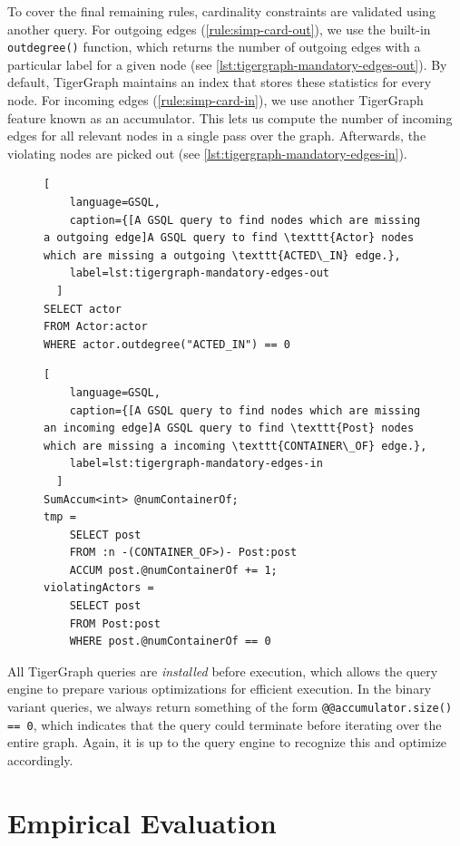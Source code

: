 \documentclass{report}
\theoremstyle{definition}
\begin{document}
To cover the final remaining rules, cardinality constraints are validated using another query. For outgoing edges (\autoref{rule:simp-card-out}), we use the built-in \texttt{outdegree()} function, which returns the number of outgoing edges with a particular label for a given node (see \autoref{lst:tigergraph-mandatory-edges-out}). By default, TigerGraph maintains an index that stores these statistics for every node. For incoming edges (\autoref{rule:simp-card-in}), we use another TigerGraph feature known as an accumulator. This lets us compute the number of incoming edges for all relevant nodes in a single pass over the graph. Afterwards, the violating nodes are picked out (see \autoref{lst:tigergraph-mandatory-edges-in}).

\begin{figure}[H]
  \begin{lstlisting}[
    language=GSQL,
    caption={[A GSQL query to find nodes which are missing a outgoing edge]A GSQL query to find \texttt{Actor} nodes which are missing a outgoing \texttt{ACTED\_IN} edge.},
    label=lst:tigergraph-mandatory-edges-out
  ]
SELECT actor
FROM Actor:actor
WHERE actor.outdegree("ACTED_IN") == 0
  \end{lstlisting}
\end{figure}
\vspace*{-8pt}
\begin{figure}[H]
  \begin{lstlisting}[
    language=GSQL,
    caption={[A GSQL query to find nodes which are missing an incoming edge]A GSQL query to find \texttt{Post} nodes which are missing a incoming \texttt{CONTAINER\_OF} edge.},
    label=lst:tigergraph-mandatory-edges-in
  ]
SumAccum<int> @numContainerOf;
tmp =
    SELECT post
    FROM :n -(CONTAINER_OF>)- Post:post
    ACCUM post.@numContainerOf += 1;
violatingActors =
    SELECT post
    FROM Post:post
    WHERE post.@numContainerOf == 0
  \end{lstlisting}
\end{figure}

All TigerGraph queries are \emph{installed} before execution, which allows the query engine to prepare various optimizations for efficient execution. In the binary variant queries, we always return something of the form \texttt{@@accumulator.size() == 0}, which indicates that the query could terminate before iterating over the entire graph. Again, it is up to the query engine to recognize this and optimize accordingly.

\chapter{Empirical Evaluation}
\label{ch:experiment}
\end{document}
